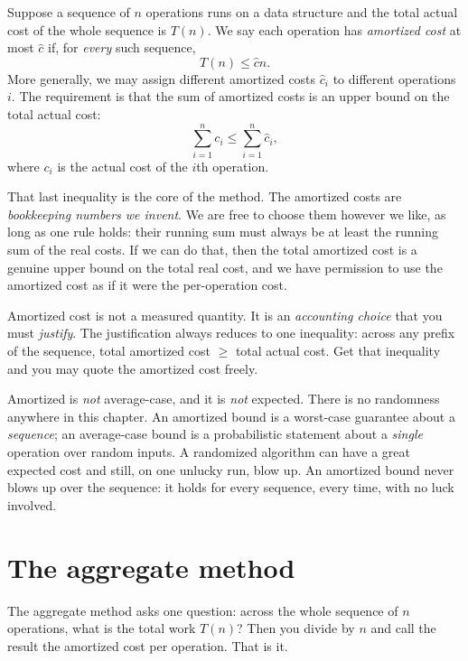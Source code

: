 \begin{definition}
\label{ch17:def-amortized}
Suppose a sequence of $n$ operations runs on a data structure and the total actual
cost of the whole sequence is $T(n)$. We say each operation has \emph{amortized
cost} at most $\hat{c}$ if, for \emph{every} such sequence,
\[
  T(n) \le \hat{c} n.
\]
More generally, we may assign different amortized costs $\hat{c}_i$ to different
operations $i$. The requirement is that the sum of amortized costs is an upper
bound on the total actual cost:
\[
  \sum_{i=1}^{n} c_i \le \sum_{i=1}^{n} \hat{c}_i,
\]
where $c_i$ is the actual cost of the $i$th operation.
\end{definition}

That last inequality is the core of the method. The
amortized costs are \emph{bookkeeping numbers we invent}. We are free to choose
them however we like, as long as one rule holds: their running sum must always be
at least the running sum of the real costs. If we can do that, then the total
amortized cost is a genuine upper bound on the total real cost, and we have
permission to use the amortized cost as if it were the per-operation cost.

\begin{focusbox}
Amortized cost is not a measured quantity. It is an \emph{accounting choice} that
you must \emph{justify}. The justification always reduces to one inequality: across
any prefix of the sequence, total amortized cost $\ge$ total actual cost. Get that
inequality and you may quote the amortized cost freely.
\end{focusbox}

\begin{trapbox}
Amortized is \emph{not} average-case, and it is \emph{not} expected. There is no
randomness anywhere in this chapter. An amortized bound is a worst-case guarantee
about a \emph{sequence}; an average-case bound is a probabilistic statement about a
\emph{single} operation over random inputs. A randomized algorithm can have a great
expected cost and still, on one unlucky run, blow up. An amortized bound never
blows up over the sequence: it holds for every sequence, every time, with no luck
involved.
\end{trapbox}

\section{The aggregate method}

The aggregate method asks one question: across the whole
sequence of $n$ operations, what is the total work $T(n)$? Then you divide by $n$
and call the result the amortized cost per operation. That is it.


